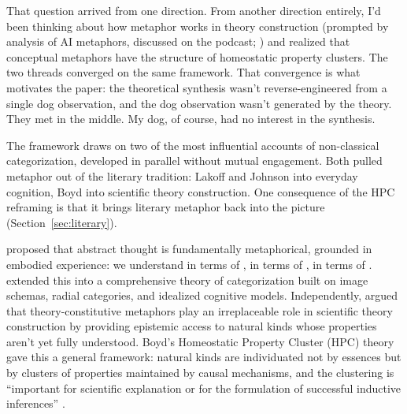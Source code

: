\documentclass[12pt]{article}
\begin{document}
That question arrived from one direction. From another direction entirely, I'd been thinking about how metaphor works in theory construction (prompted by  analysis of AI metaphors, discussed on the  podcast; \citealt{cooperrider2026}) and realized that conceptual metaphors have the structure of homeostatic property clusters. The two threads converged on the same framework. That convergence is what motivates the paper: the theoretical synthesis wasn't reverse-engineered from a single dog observation, and the dog observation wasn't generated by the theory. They met in the middle. My dog, of course, had no interest in the synthesis.

The framework draws on two of the most influential accounts of non-classical categorization, developed in parallel without mutual engagement. Both pulled metaphor out of the literary tradition: Lakoff and Johnson into everyday cognition, Boyd into scientific theory construction. One consequence of the HPC reframing is that it brings literary metaphor back into the picture (Section~\ref{sec:literary}).

\textcite{lakoff1980} proposed that abstract thought is fundamentally metaphorical, grounded in embodied experience: we understand  in terms of ,  in terms of ,  in terms of . \textcite{lakoff1987} extended this into a comprehensive theory of categorization built on image schemas, radial categories, and idealized cognitive models. Independently, \textcite{boyd1979} argued that theory-constitutive metaphors play an irreplaceable role in scientific theory construction by providing epistemic access to natural kinds whose properties aren't yet fully understood. Boyd's Homeostatic Property Cluster (HPC) theory \citep{boyd1989, boyd1999} gave this a general framework: natural kinds are individuated not by essences but by clusters of properties maintained by causal mechanisms, and the clustering is \enquote{important for scientific explanation or for the formulation of successful inductive inferences} \citep[526]{boyd1993metaphor}.
\end{document}
